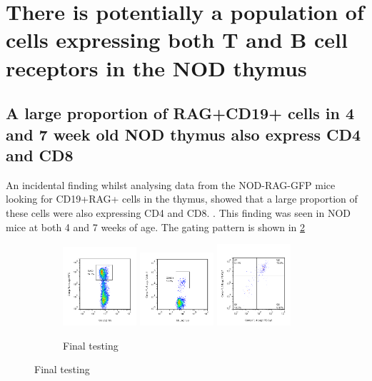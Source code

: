 \section{There is potentially a population of cells expressing both T and B cell receptors in the NOD thymus}

\subsection{A large proportion of RAG+CD19+ cells in 4 and 7 week old NOD thymus also express CD4 and CD8}
An incidental finding whilst analysing data from the NOD-RAG-GFP mice looking for CD19+RAG+ cells in the thymus, showed that a large proportion of these cells were also expressing CD4 and CD8. . 
This finding was seen in NOD mice at both 4 and 7 weeks of age.
The gating pattern is shown in \cref{fig:RAGposDP}

\begin{figure}	
	\begin{subfigure}{\textwidth}
		\includegraphics[width=0.3\textwidth] {Figures/RAGposthy1241014.png}
		\hfill	
		\includegraphics[width=0.3\textwidth] {Figures/RAGCD19posthy1}		
		\hfill	
		\includegraphics[width=0.3\textwidth] {Figures/RAGCD19CD4CD8posthy1}
		\caption{Final testing}
		\label{fig:RAGposDP}
	\end{subfigure}
\end{figure}



